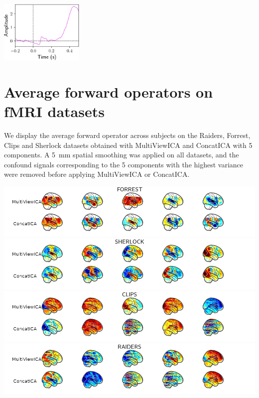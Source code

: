 {\includegraphics[width=0.3\textwidth]{figures/mvica/camcan_source_10.pdf}%
 \\
}

\section{Average forward operators on fMRI datasets}
\label{sec:spatial_maps}
We display the average forward operator across subjects on the Raiders, Forrest, Clips and Sherlock datasets obtained with MultiViewICA and ConcatICA with 5 components. A 5~mm spatial smoothing was applied on all datasets, and the confound signals corresponding to the 5 components with the highest variance were removed before applying MultiViewICA or ConcatICA.

{\centering

  \includegraphics[width=\textwidth]{figures/mvica/maps_forrest.png} \\
  \includegraphics[width=\textwidth]{figures/mvica/maps_sherlock.png} \\
  \includegraphics[width=\textwidth]{figures/mvica/maps_gallant.png} \\
  \includegraphics[width=\textwidth]{figures/mvica/maps_raiders.png} \\
}


